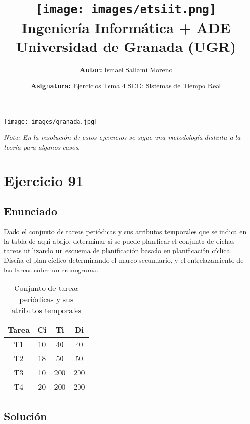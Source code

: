 \documentclass[a4paper,12pt]{article}
\title{
    \vspace{-2cm}
    \texttt{[image: images/etsiit.png]} \\ %
    \LARGE Ingeniería Informática + ADE\\
    \large Universidad de Granada (UGR)\\[1cm]
}
\author{\textbf{Autor:} Ismael Sallami Moreno}
\date{\textbf{Asignatura:} Ejercicios Tema 4 SCD: Sistemas de Tiempo Real}
\begin{document}
\maketitle
\thispagestyle{empty}

\begin{center}
    \texttt{[image: images/granada.jpg]} \\ %
    \vfill
\end{center}

\newpage

\tableofcontents
\newpage

\begin{tcolorbox}[colback=red!5!white,colframe=red!75!black]
    \textit{Nota: En la resolución de estos ejercicios se sigue una metodología distinta a la teoría para algunos casos. }
    
\end{tcolorbox}

\section{Ejercicio 91}
\subsection{Enunciado}
Dado el conjunto de tareas periódicas y sus atributos temporales que se indica en la tabla de aquí abajo, determinar si se puede planificar el conjunto de dichas tareas utilizando un esquema de planificación basado en planificación cíclica. Diseña el plan cíclico determinando el marco secundario, y el entrelazamiento de las tareas sobre un cronograma.

\begin{table}[H]
\centering
\begin{tabular}{|c|c|c|c|}
\hline
\textbf{Tarea} & \textbf{Ci} & \textbf{Ti} & \textbf{Di} \\ \hline
T1 & 10 & 40 & 40 \\ \hline
T2 & 18 & 50 & 50 \\ \hline
T3 & 10 & 200 & 200 \\ \hline
T4 & 20 & 200 & 200 \\ \hline
\end{tabular}
\caption{Conjunto de tareas periódicas y sus atributos temporales}
\end{table}

\subsection{Solución}
\end{document}
